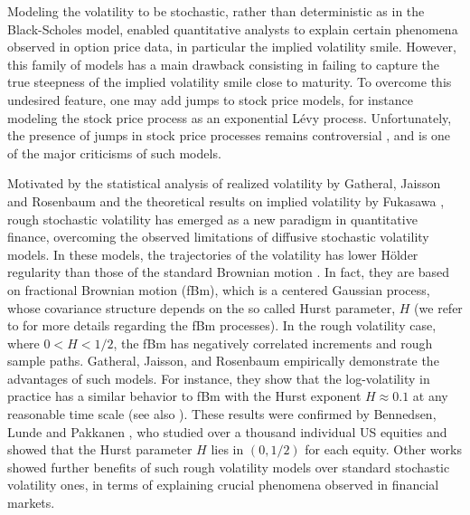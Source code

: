 Modeling the volatility to be stochastic, rather than deterministic as in the Black-Scholes model, enabled quantitative analysts to  explain certain phenomena observed in option price data, in particular the implied volatility smile. However, this family of models has a  main drawback consisting in failing  to capture the true steepness of the implied volatility smile close to maturity. To overcome this undesired feature, one may add jumps to stock price models, for instance modeling the stock price process as an exponential L\'evy process. Unfortunately, the presence of jumps in stock price processes remains controversial \cite{christensen2014fact,bajgrowicz2015jumps}, and is one of the major criticisms of such models. 



Motivated by the statistical analysis of realized volatility by Gatheral, Jaisson and Rosenbaum \cite{gatheral2014volatility} and the theoretical results on implied volatility by Fukasawa \cite{fukasawa2011asymptotic}, rough stochastic volatility has emerged as a new paradigm in quantitative finance, overcoming the observed limitations of  diffusive stochastic volatility models. In these models, the trajectories of the volatility  has lower H\"older regularity than those of the standard Brownian motion \cite{gatheral2014volatility,bayer2016pricing}. In fact, they are based on fractional Brownian motion (fBm), which  is a centered Gaussian process, whose covariance structure depends on  the so called Hurst parameter, $H$ (we refer to  \cite{mandelbrot1968fractional,coutin07introduction,biagini2008stochastic} for more details regarding the fBm processes). In the rough volatility case, where $0<H<1/2$, the fBm has negatively correlated increments and rough sample paths.   Gatheral, Jaisson, and Rosenbaum \cite{gatheral2014volatility}  empirically demonstrate the advantages of such models. For instance, they show that the log-volatility in practice has a similar behavior to  fBm with the Hurst exponent $H \approx 0.1$ at any reasonable time scale (see also  \cite{gatheral2014volatility_2}).  These results were confirmed  by Bennedsen, Lunde and Pakkanen \cite{bennedsen2016decoupling}, who studied over a thousand individual US equities and showed that the Hurst parameter $H$ lies in $(0,1/2)$ for each equity. Other  works \cite{gatheral2014volatility,bennedsen2016decoupling,bayer2016pricing} showed further benefits of  such rough volatility models over  standard stochastic volatility ones,   in terms of explaining crucial phenomena  observed in  financial markets.
 
